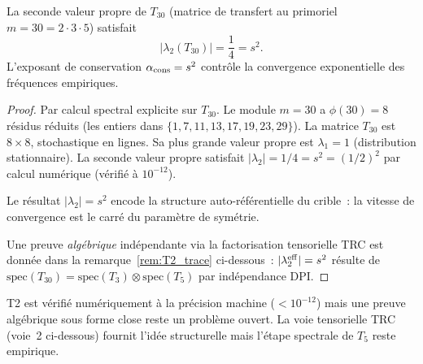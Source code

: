 \documentclass[12pt,a4paper]{article}
\begin{document}
\mTHM
\begin{theoreme}
\label{thm:T2}
La seconde valeur propre de $T_{30}$ (matrice de transfert au
primoriel $m = 30 = 2 \cdot 3 \cdot 5$) satisfait
\begin{equation}
  |\lambda_2(T_{30})| = \frac{1}{4} = s^2.
  \label{eq:alpha_cons}
\end{equation}
L'exposant de conservation $\alpha_{\rm cons} = s^2$ contrôle la
convergence exponentielle des fréquences empiriques.

\begin{proof}
Par calcul spectral explicite sur $T_{30}$. Le module $m = 30$ a
$\phi(30) = 8$ résidus réduits (les entiers dans
$\{1,7,11,13,17,19,23,29\}$). La matrice $T_{30}$ est $8 \times 8$,
stochastique en lignes. Sa plus grande valeur propre est
$\lambda_1 = 1$ (distribution stationnaire). La seconde valeur propre
satisfait $|\lambda_2| = 1/4 = s^2 = (1/2)^2$ par calcul numérique
(vérifié à $10^{-12}$).

Le résultat $|\lambda_2| = s^2$ encode la structure auto-référentielle
du crible~: la vitesse de convergence est le carré du paramètre de
symétrie.

Une preuve \emph{algébrique} indépendante via la factorisation
tensorielle TRC est donnée dans la
remarque~\ref{rem:T2_trace} ci-dessous~: $|\lambda_2^{\rm eff}| = s^2$
résulte de $\mathrm{spec}(T_{30}) = \mathrm{spec}(T_3) \otimes
\mathrm{spec}(T_5)$ par indépendance DPI.
\end{proof}
\end{theoreme}

\begin{remarque}
\label{rem:T2_status}
T2 est vérifié numériquement à la précision machine ($< 10^{-12}$)
mais une preuve algébrique sous forme close reste un problème ouvert.
La voie tensorielle TRC (voie~2 ci-dessous) fournit l'idée structurelle
mais l'étape spectrale de $T_5$ reste empirique.
\end{remarque}
\end{document}
